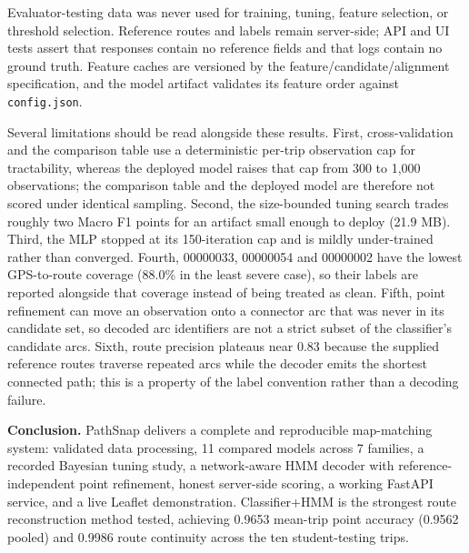 \documentclass[11pt,a4paper]{article}
\newcommand{\code}[1]{\texttt{\small #1}}
\begin{document}
Evaluator-testing data was never used for training, tuning, feature selection, or threshold selection. Reference routes and labels remain server-side; API and UI tests assert that responses contain no reference fields and that logs contain no ground truth. Feature caches are versioned by the feature/candidate/alignment specification, and the model artifact validates its feature order against \code{config.\allowbreak{}json}.

Several limitations should be read alongside these results. First, cross-validation and the comparison table use a deterministic per-trip observation cap for tractability, whereas the deployed model raises that cap from 300 to 1,000 observations; the comparison table and the deployed model are therefore not scored under identical sampling. Second, the size-bounded tuning search trades roughly two Macro F1 points for an artifact small enough to deploy (21.9 MB). Third, the MLP stopped at its 150-iteration cap and is mildly under-trained rather than converged. Fourth, 00000033, 00000054 and 00000002 have the lowest GPS-to-route coverage (88.0\% in the least severe case), so their labels are reported alongside that coverage instead of being treated as clean. Fifth, point refinement can move an observation onto a connector arc that was never in its candidate set, so decoded arc identifiers are not a strict subset of the classifier's candidate arcs. Sixth, route precision plateaus near 0.83 because the supplied reference routes traverse repeated arcs while the decoder emits the shortest connected path; this is a property of the label convention rather than a decoding failure.

\textbf{Conclusion.} PathSnap delivers a complete and reproducible map-matching system: validated data processing, 11 compared models across 7 families, a recorded Bayesian tuning study, a network-aware HMM decoder with reference-independent point refinement, honest server-side scoring, a working FastAPI service, and a live Leaflet demonstration. Classifier+HMM is the strongest route reconstruction method tested, achieving 0.9653 mean-trip point accuracy (0.9562 pooled) and 0.9986 route continuity across the ten student-testing trips.
\end{document}
